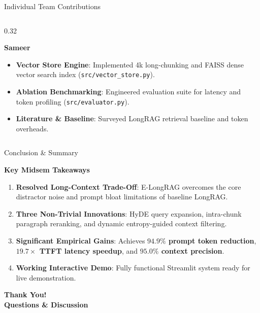 \documentclass[10pt,aspectratio=169]{beamer}
\begin{document}
\begin{frame}{Individual Team Contributions}
\begin{columns}[onlytextwidth,T]
        \begin{column}{0.32\textwidth}
            \begin{block}{\textbf{Sameer}}
                \footnotesize
                \begin{itemize}
                    \item \textbf{Vector Store Engine}: Implemented 4k long-chunking and FAISS dense vector search index (\texttt{src/vector\_store.py}).
                    \item \textbf{Ablation Benchmarking}: Engineered evaluation suite for latency and token profiling (\texttt{src/evaluator.py}).
                    \item \textbf{Literature \& Baseline}: Surveyed LongRAG retrieval baseline and token overheads.
                \end{itemize}
            \end{block}
        \end{column}
    \end{columns}
\end{frame}

\begin{frame}{Conclusion \& Summary}
    \begin{block}{\textbf{Key Midsem Takeaways}}
        \begin{enumerate}
            \item \textbf{Resolved Long-Context Trade-Off}: E-LongRAG overcomes the core distractor noise and prompt bloat limitations of baseline LongRAG.
            \item \textbf{Three Non-Trivial Innovations}: HyDE query expansion, intra-chunk paragraph reranking, and dynamic entropy-guided context filtering.
            \item \textbf{Significant Empirical Gains}: Achieves \textbf{$94.9\%$ prompt token reduction}, \textbf{$19.7\times$ TTFT latency speedup}, and \textbf{$95.0\%$ context precision}.
            \item \textbf{Working Interactive Demo}: Fully functional Streamlit system ready for live demonstration.
        \end{enumerate}
    \end{block}
    
    \vspace{0.25cm}
    \begin{center}
        \Huge \textbf{Thank You!} \\
        \vspace{0.15cm}
        \normalsize \textbf{Questions \& Discussion}
    \end{center}
\end{frame}
\end{document}
